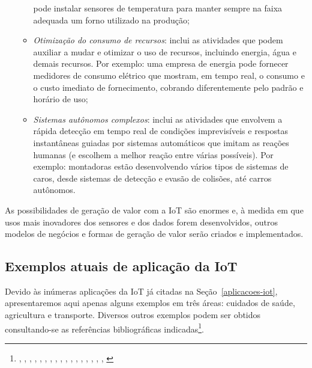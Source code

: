 \documentclass[pdftex, brazil, 12pt, twoside]{article}
\begin{document}
\begin{itemize}
\begin{itemize}
    pode instalar sensores de temperatura para manter sempre na faixa adequada
    um forno utilizado na produção;
  \item \emph{Otimização do consumo de recursos}: inclui as atividades que podem
    auxiliar a mudar e otimizar o uso de recursos, incluindo energia, água e
    demais recursos. Por exemplo: uma empresa de energia pode fornecer medidores
    de consumo elétrico que mostram, em tempo real, o consumo e o custo imediato
    de fornecimento, cobrando diferentemente pelo padrão e horário de uso;
  \item \emph{Sistemas autônomos complexos}: inclui as atividades que envolvem
    a rápida detecção em tempo real de condições imprevisíveis e respostas
    instantâneas guiadas por sistemas automáticos que imitam as reações humanas
    (e escolhem a melhor reação entre várias possíveis). Por exemplo: montadoras
    estão desenvolvendo vários tipos de sistemas de caros, desde sistemas de
    detecção e evasão de colisões, até carros autônomos.
  \end{itemize}
\end{itemize}

As possibilidades de geração de valor com a IoT são enormes e, à medida
em que usos mais inovadores dos sensores e dos dados forem
desenvolvidos, outros modelos de negócios e formas de geração de valor serão
criados e implementados.


\subsection{Exemplos atuais de aplicação da IoT}
\label{aplicacoes-iot-exemplos}

Devido às inúmeras aplicações da IoT já citadas na Seção~\ref{aplicacoes-iot},
apresentaremos aqui apenas alguns exemplos em três áreas: cuidados de saúde,
agricultura e transporte. Diversos outros exemplos podem ser obtidos consultando-se
as referências bibliográficas indicadas\footnote{\citet{OliverWymanIoT2015},
  \citet{UKGOSWalportIoT2014}, \citet{IEEEIoTReport}, \citet{IEEEIoTDefinition},
  \citet{ChuiIoT2010}, \citet{BughinExecutiveIoT2015}, \citet{GuptaMcKinseyIoT2017},
  \citet{McKinseyIoTHype}, \citet{SAPFutureIoT}, \citet{SASIoTUseCases2016},
  \citet{MorganStanleyIoTnow2013}, \citet{AlaskaIoTComm2015}, \citet{BackDeckerIoT2014},
  \citet{MazakIoT2016}, \citet{CopenhagenIoT2013}, \citet{KansasIoT2016},
  \citet{RockwellIoT2016}, \citet{MississaugaIoT2015}}.
\end{document}
